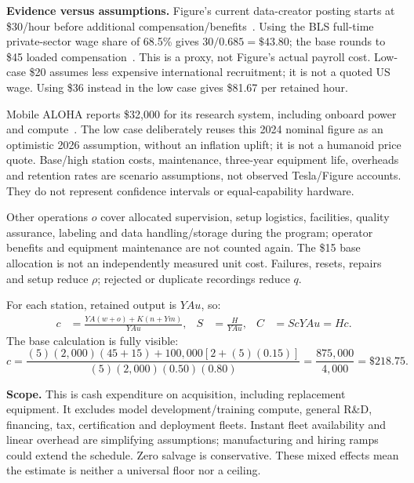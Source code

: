 \documentclass{article}
\begin{document}
\textbf{Evidence versus assumptions.} Figure's current data-creator posting
starts at \$30/hour before additional compensation/benefits~\cite{wage}.
Using the BLS full-time private-sector wage share of 68.5\% gives
$30/0.685=\$43.80$; the base rounds to \$45 loaded compensation~\cite{bls}.
This is a proxy, not Figure's actual payroll cost. Low-case \$20 assumes
less expensive international recruitment; it is not a quoted US wage.
Using \$36 instead in the low case gives \$81.67 per retained hour.

Mobile ALOHA reports \$32,000 for its research system, including onboard
power and compute~\cite{aloha}. The low case deliberately reuses this 2024
nominal figure as an optimistic 2026 assumption, without an inflation uplift;
it is not a humanoid price quote. Base/high station costs, maintenance,
three-year equipment life, overheads and retention rates are scenario
assumptions, not observed Tesla/Figure accounts. They do not represent
confidence intervals or equal-capability hardware.

Other operations $o$ cover allocated supervision, setup logistics,
facilities, quality assurance, labeling and data handling/storage during the
program; operator benefits and equipment maintenance are not counted again.
The \$15 base allocation is not an independently measured unit cost.
Failures, resets, repairs and setup reduce $\rho$; rejected or duplicate
recordings reduce $q$.

For each station, retained output is $YAu$, so:
\begin{align}
c&=\frac{YA(w+o)+K(n+Ym)}{YAu},&
S&=\frac{H}{YAu},&
C&=ScYAu=Hc. \label{eq:cost}
\end{align}
The base calculation is fully visible:
\[
c=\frac{(5)(2{,}000)(45+15)+100{,}000[2+(5)(0.15)]}
{(5)(2{,}000)(0.50)(0.80)}
=\frac{875{,}000}{4{,}000}
=\$218.75.
\]

\textbf{Scope.} This is cash expenditure on acquisition, including replacement
equipment. It excludes model development/training compute, general R\&D,
financing, tax, certification and deployment fleets. Instant fleet availability
and linear overhead are simplifying assumptions; manufacturing and hiring
ramps could extend the schedule. Zero salvage is conservative. These mixed
effects mean the estimate is neither a universal floor nor a ceiling.
\end{document}
